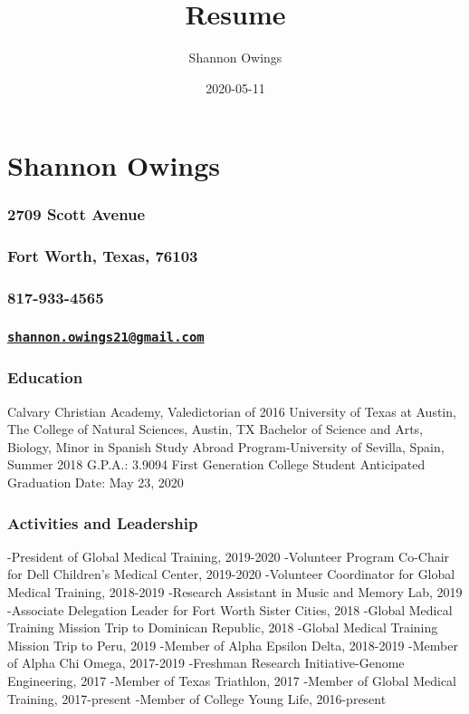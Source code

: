 \documentclass[]{article}
\title{Resume}
\author{Shannon Owings}
\date{2020-05-11}
\begin{document}
\maketitle

\section{Shannon Owings}\label{shannon-owings}

\subsubsection{2709 Scott Avenue}\label{scott-avenue}

\subsubsection{Fort Worth, Texas, 76103}\label{fort-worth-texas-76103}

\subsubsection{817-933-4565}\label{section}

\subsubsection{\texorpdfstring{\href{mailto:shannon.owings21@gmail.com}{\nolinkurl{shannon.owings21@gmail.com}}}{shannon.owings21@gmail.com}}\label{shannon.owings21gmail.com}

\subsubsection{Education}\label{education}

Calvary Christian Academy, Valedictorian of 2016 University of Texas at
Austin, The College of Natural Sciences, Austin, TX Bachelor of Science
and Arts, Biology, Minor in Spanish Study Abroad Program-University of
Sevilla, Spain, Summer 2018 G.P.A.: 3.9094 First Generation College
Student Anticipated Graduation Date: May 23, 2020

\subsubsection{Activities and
Leadership}\label{activities-and-leadership}

-President of Global Medical Training, 2019-2020 -Volunteer Program
Co-Chair for Dell Children's Medical Center, 2019-2020 -Volunteer
Coordinator for Global Medical Training, 2018-2019 -Research Assistant
in Music and Memory Lab, 2019 -Associate Delegation Leader for Fort
Worth Sister Cities, 2018 -Global Medical Training Mission Trip to
Dominican Republic, 2018 -Global Medical Training Mission Trip to Peru,
2019 -Member of Alpha Epsilon Delta, 2018-2019 -Member of Alpha Chi
Omega, 2017-2019 -Freshman Research Initiative-Genome Engineering, 2017
-Member of Texas Triathlon, 2017 -Member of Global Medical Training,
2017-present -Member of College Young Life, 2016-present
\end{document}
